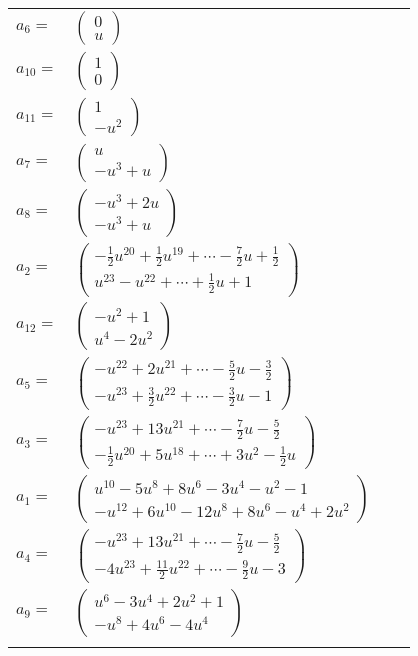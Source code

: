 \documentclass[1p]{elsarticle_modified}
\theoremstyle{definition}
\begin{document}
\begin{tabular}{m{7pt} m{180pt} m{7pt} m{180pt} }
\flushright $a_{6}=$&$\begin{pmatrix}0\\u\end{pmatrix}$ \\
\flushright $a_{10}=$&$\begin{pmatrix}1\\0\end{pmatrix}$ \\
\flushright $a_{11}=$&$\begin{pmatrix}1\\- u^2\end{pmatrix}$ \\
\flushright $a_{7}=$&$\begin{pmatrix}u\\- u^3+u\end{pmatrix}$ \\
\flushright $a_{8}=$&$\begin{pmatrix}- u^3+2 u\\- u^3+u\end{pmatrix}$ \\
\flushright $a_{2}=$&$\begin{pmatrix}-\frac{1}{2} u^{20}+\frac{1}{2} u^{19}+\cdots-\frac{7}{2} u+\frac{1}{2}\\u^{23}- u^{22}+\cdots+\frac{1}{2} u+1\end{pmatrix}$ \\
\flushright $a_{12}=$&$\begin{pmatrix}- u^2+1\\u^4-2 u^2\end{pmatrix}$ \\
\flushright $a_{5}=$&$\begin{pmatrix}- u^{22}+2 u^{21}+\cdots-\frac{5}{2} u-\frac{3}{2}\\- u^{23}+\frac{3}{2} u^{22}+\cdots-\frac{3}{2} u-1\end{pmatrix}$ \\
\flushright $a_{3}=$&$\begin{pmatrix}- u^{23}+13 u^{21}+\cdots-\frac{7}{2} u-\frac{5}{2}\\-\frac{1}{2} u^{20}+5 u^{18}+\cdots+3 u^2-\frac{1}{2} u\end{pmatrix}$ \\
\flushright $a_{1}=$&$\begin{pmatrix}u^{10}-5 u^8+8 u^6-3 u^4- u^2-1\\- u^{12}+6 u^{10}-12 u^8+8 u^6- u^4+2 u^2\end{pmatrix}$ \\
\flushright $a_{4}=$&$\begin{pmatrix}- u^{23}+13 u^{21}+\cdots-\frac{7}{2} u-\frac{5}{2}\\-4 u^{23}+\frac{11}{2} u^{22}+\cdots-\frac{9}{2} u-3\end{pmatrix}$ \\
\flushright $a_{9}=$&$\begin{pmatrix}u^6-3 u^4+2 u^2+1\\- u^8+4 u^6-4 u^4\end{pmatrix}$\\&\end{tabular}
\end{document}
